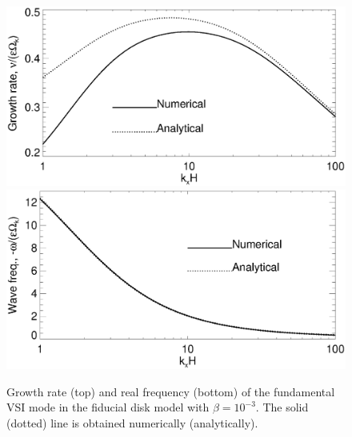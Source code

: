 \begin{figure}
  \includegraphics[width=\linewidth,clip=true,trim=0cm 1.75cm 0cm
  0cm]{figures/compare_eigen_imag_iso} 
  \includegraphics[width=\linewidth,clip=true,trim=0cm 0cm 0cm
  1cm]{figures/compare_eigen_real_iso}
  \caption{Growth rate (top) and real frequency (bottom) of the
    fundamental VSI mode in the fiducial disk model with $\beta =
    10^{-3}$. 
    The solid (dotted) line is obtained numerically
    (analytically).  
    \label{iso_eigen_kx} 
  }
\end{figure}



